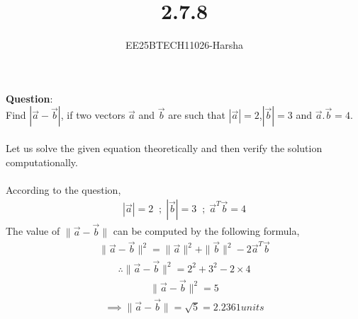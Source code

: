 \documentclass[journal]{IEEEtran}
\begin{document}

\vspace{3cm}

\title{2.7.8}
\author{EE25BTECH11026-Harsha}
 \maketitle
{\let\newpage\relax\maketitle}

\renewcommand{\thefigure}{\theenumi}
\renewcommand{\thetable}{\theenumi}
\setlength{\intextsep}{10pt} %


\renewcommand{\thetable}{\theenumi}

\textbf{Question}:\\
    Find $|\vec{a}-\vec{b}|$, if two vectors $\vec{a}$ and $\vec{b}$ are such that $|\vec{a}|=2$,$|\vec{b}|=3$ and $\vec{a}.\vec{b}=4$.\\ 
\solution \\
Let us solve the given equation theoretically and then verify the solution computationally.\\
\\
According to the question,\\
\begin{align}
    |\vec{a}|=2 \;\; ; \; |\vec{b}|=3 \;\; ;\; \vec{a}^T\vec{b}=4
\end{align}
The  value of $\|\vec{a}-\vec{b}\|$ can be computed by the following formula,
\begin{align}
    \|\vec{a}-\vec{b}\|^2=\|\vec{a}\|^2+\|\vec{b}\|^2-2\vec{a}^T\vec{b}
\end{align}
\begin{align}
    \therefore \|\vec{a}-\vec{b}\|^2=2^2+3^2-2\times4
\end{align}
\begin{align}
    \|\vec{a}-\vec{b}\|^2=5
\end{align}
\begin{align}
    \implies \|\vec{a}-\vec{b}\|=\sqrt{5}=2.2361 units
\end{align}



 
\end{document}
